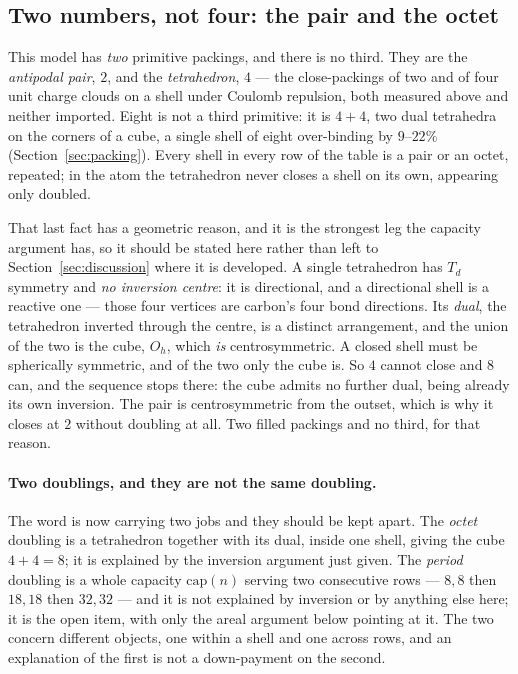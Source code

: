 \documentclass[11pt]{article}
\begin{document}
\subsection{Two numbers, not four: the pair and the octet}\label{sec:twoeight}

This model has \emph{two} primitive packings, and there is no third. They are the
\emph{antipodal pair}, $2$, and the \emph{tetrahedron}, $4$ --- the close-packings of two and of
four unit charge clouds on a shell under Coulomb repulsion, both measured above and neither
imported. Eight is not a third primitive: it is $4{+}4$, two dual tetrahedra on the corners of a
cube, a single shell of eight over-binding by $9$--$22\%$ (Section~\ref{sec:packing}). Every
shell in every row of the table is a pair or an octet, repeated; in the atom the tetrahedron
never closes a shell on its own, appearing only doubled.

That last fact has a geometric reason, and it is the strongest leg the capacity argument has, so it
should be stated here rather than left to Section~\ref{sec:discussion} where it is developed. A
single tetrahedron has $T_d$ symmetry and \emph{no inversion centre}: it is directional, and a
directional shell is a reactive one --- those four vertices are carbon's four bond directions. Its
\emph{dual}, the tetrahedron inverted through the centre, is a distinct arrangement, and the union
of the two is the cube, $O_h$, which \emph{is} centrosymmetric. A closed shell must be spherically
symmetric, and of the two only the cube is. So $4$ cannot close and $8$ can, and the sequence stops
there: the cube admits no further dual, being already its own inversion. The pair is centrosymmetric
from the outset, which is why it closes at $2$ without doubling at all. Two filled packings and no
third, for that reason.

\paragraph{Two doublings, and they are not the same doubling.} The word is now carrying two jobs and
they should be kept apart. The \emph{octet} doubling is a tetrahedron together with its dual, inside
one shell, giving the cube $4{+}4=8$; it is explained by the inversion argument just given. The
\emph{period} doubling is a whole capacity $\mathrm{cap}(n)$ serving two consecutive rows ---
$8,8$ then $18,18$ then $32,32$ --- and it is not explained by inversion or by anything else here;
it is the open item, with only the areal argument below pointing at it. The two concern different
objects, one within a shell and one across rows, and an explanation of the first is not a
down-payment on the second.
\end{document}
